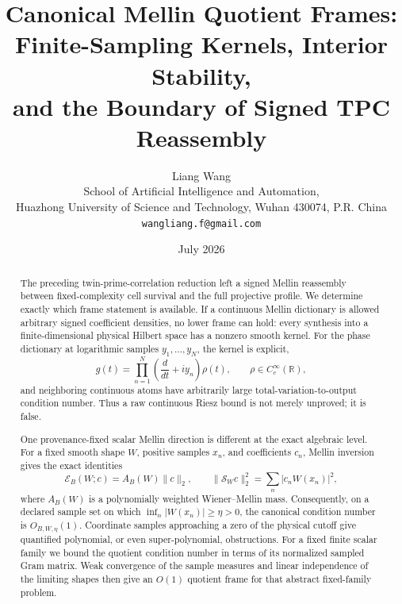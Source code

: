 \documentclass[11pt]{article}
\title{\bfseries Canonical Mellin Quotient Frames:\\
Finite-Sampling Kernels, Interior Stability,\\
and the Boundary of Signed TPC Reassembly}
\author{Liang Wang\\
\small School of Artificial Intelligence and Automation,\\[-2pt]
\small Huazhong University of Science and Technology, Wuhan 430074, P.R. China\\
\small \texttt{wangliang.f@gmail.com}}
\date{July 2026}
\theoremstyle{definition}
\theoremstyle{remark}
\newcommand{\R}{\mathbb R}
\newcommand{\cE}{\mathcal E}
\newcommand{\cS}{\mathcal S}
\begin{document}
\maketitle

\begin{abstract}
The preceding twin-prime-correlation reduction left a signed Mellin
reassembly between fixed-complexity cell survival and the full
projective profile.  We determine exactly which frame statement is
available.  If a continuous Mellin dictionary is allowed arbitrary
signed coefficient densities, no lower frame can hold: every synthesis
into a finite-dimensional physical Hilbert space has a nonzero smooth
kernel.  For the phase dictionary at logarithmic samples
\(y_1,\ldots,y_N\), the kernel is explicit,
\[
 g(t)=\prod_{n=1}^{N}\left(\frac d{dt}+iy_n\right)\rho(t),
 \qquad \rho\in C_c^\infty(\R),
\]
and neighboring continuous atoms have arbitrarily large
total-variation-to-output condition number.  Thus a raw continuous
Riesz bound is not merely unproved; it is false.

One provenance-fixed scalar Mellin direction is different at the exact
algebraic level.  For a fixed smooth shape \(W\), positive samples
\(x_n\), and coefficients
\(c_n\), Mellin inversion gives the exact identities
\[
 \cE_B(W;c)=A_B(W)\|c\|_2,
 \qquad
 \|\cS_Wc\|_2^2=\sum_n|c_nW(x_n)|^2,
\]
where \(A_B(W)\) is a polynomially weighted Wiener--Mellin mass.
Consequently, on a declared sample set on which
\(\inf_n|W(x_n)|\geq\eta>0\), the canonical condition number is
\(O_{B,W,\eta}(1)\).  Coordinate samples approaching a zero of the
physical cutoff give quantified polynomial, or even super-polynomial,
obstructions.  For a fixed finite scalar family we bound the quotient
condition number in terms of its normalized sampled Gram matrix.  Weak
convergence of the sample measures and linear independence of the
limiting shapes then give an \(O(1)\) quotient frame for that abstract
fixed-family problem.


\end{abstract}
\end{document}

